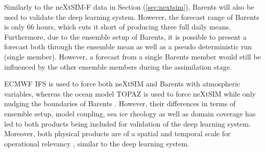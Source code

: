 \documentclass[../main/thesis.tex]{subfiles}
\begin{document}
Similarly to the neXtSIM-F data in Section (\ref{sec:nextsim}), Barents will also be used to validate the deep learning system. However, the forecast range of Barents is only 66 hours, which cuts it short of producing three full daily means. Furthermore, due to the ensemble setup of Barents, it is possible to present a forecast both through the ensemble mean as well as a pseudo deterministic run (single member). However, a forecast from a single Barents member would still be influenced by the other ensemble members during the assimilation stage. 

ECMWF IFS is used to force both neXtSIM and Barents with atmospheric variables, whereas the ocean model TOPAZ \citep{Sakov2012} is used to force neXtSIM \citep{Williams2021} while only nudging the boundaries of Barents \citep{Roehrs2022}. However, their differences in terms of ensemble setup, model coupling, sea ice rheology as well as domain coverage has led to both products being included for validation of the deep learning system. Moreover, both physical products are of a spatial and temporal scale for operational relevancy \citep{Wagner2020}, similar to the deep learning system. 





\biblio
\end{document}
